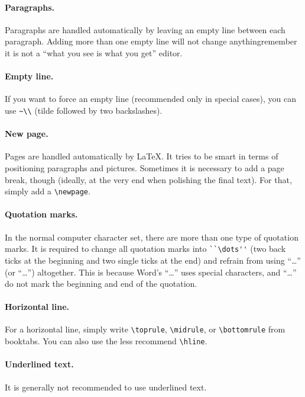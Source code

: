 \paragraph{Paragraphs.} Paragraphs are handled automatically by leaving an empty
line between each paragraph. Adding more than one empty line will not change
anything\textemdash{}remember it is not a ``what you see is what you get''
editor.

\paragraph{Empty line.} If you want to force an empty line (recommended only in
special cases), you can use \lstinline[language=Tex]!~\\! (tilde followed by two
backslashes).

\paragraph{New page.} Pages are handled automatically by \LaTeX{}. It tries to
be smart in terms of positioning paragraphs and pictures. Sometimes it is
necessary to add a page break, though (ideally, at the very end when polishing
the final text). For that, simply add a \lstinline[language=Tex]!\newpage!.

\paragraph{Quotation marks.} In the normal computer character set, there are
more than one type of quotation marks. It is required to change all quotation
marks into \lstinline[language=Tex]!``\dots''! (two back ticks at the beginning
and two single ticks at the end) and refrain from using ``\dots'' (or “\dots”)
altogether. This is because Word's “\dots” uses special characters, and
``\dots'' do not mark the beginning and end of the quotation.

\paragraph{Horizontal line.} For a horizontal line, simply write
\lstinline[language=Tex]!\toprule!, \lstinline[language=Tex]!\midrule!, or
\lstinline[language=Tex]!\bottomrule! from booktabs. You can also use the less
recommend \lstinline[language=Tex]!\hline!. %

\paragraph{Underlined text.} It is generally not recommended to use underlined
text.

